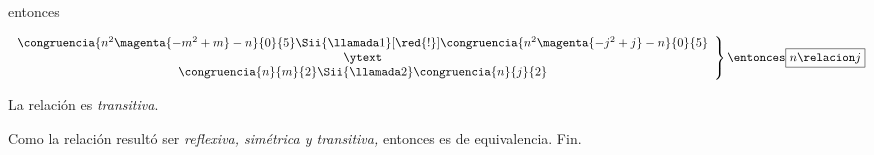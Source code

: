 \begin{enumerate}[label=\alph*)]
        entonces

        $$
          \left.
          \begin{array}{c}
            \congruencia{n^2 \magenta{- m^2 + m} - n}{0}{5}
            \Sii{\llamada1}[\red{!}]
            \congruencia{n^2 \magenta{- j^2 + j} - n}{0}{5}
            \\
            \ytext \\
            \congruencia{n}{m}{2}
            \Sii{\llamada2}
            \congruencia{n}{j}{2}
          \end{array}
          \right\}
          \entonces
          \boxed{
            n \relacion j}
        $$\par
        La relación es \textit{transitiva}.\par
        Como la relación resultó ser \textit{reflexiva, simétrica y transitiva,} entonces es de equivalencia. Fin.
\end{enumerate}
